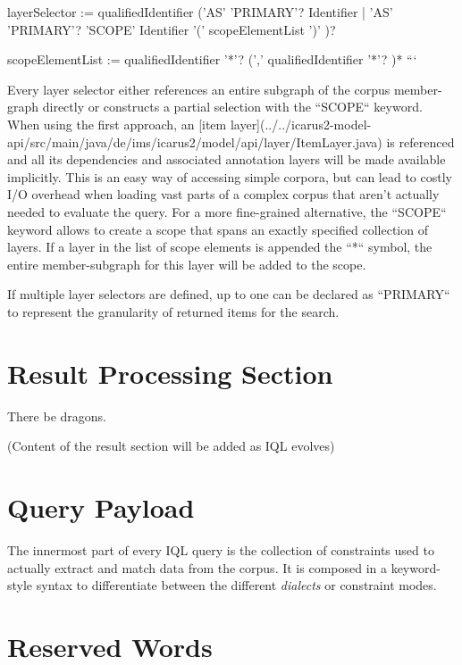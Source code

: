 \documentclass[11pt]{article}
\begin{document}
layerSelector := qualifiedIdentifier ('AS' 'PRIMARY'? Identifier | 'AS' 'PRIMARY'? 'SCOPE' Identifier '(' scopeElementList ')' )?

scopeElementList := qualifiedIdentifier '*'? (',' qualifiedIdentifier '*'? )*
```

Every layer selector either references an entire subgraph of the corpus member-graph directly or constructs a partial selection with the ``SCOPE`` keyword. When using the first approach, an [item layer](../../icarus2-model-api/src/main/java/de/ims/icarus2/model/api/layer/ItemLayer.java) is referenced and all its dependencies and associated annotation layers will be made available implicitly. This is an easy way of accessing simple corpora, but can lead to costly I/O overhead when loading vast parts of a complex corpus that aren't actually needed to evaluate the query. For a more fine-grained alternative, the ``SCOPE`` keyword allows to create a scope that spans an exactly specified collection of layers. If a layer in the list of scope elements is appended the ``*`` symbol, the entire member-subgraph for this layer will be added to the scope.

If multiple layer selectors are defined, up to one can be declared as ``PRIMARY`` to represent the granularity of returned items for the search.


\section{Result Processing Section}
\label{sec:result-processing}

There be dragons.

(Content of the result section will be added as IQL evolves)


\section{Query Payload}
\label{sec:query-payload}

The innermost part of every IQL query is the collection of constraints used to actually extract and match data from the corpus.
It is composed in a keyword-style syntax to differentiate between the different \textit{dialects} or constraint modes.

\section{Reserved Words}
\label{sec:reserved-words}
\end{document}

